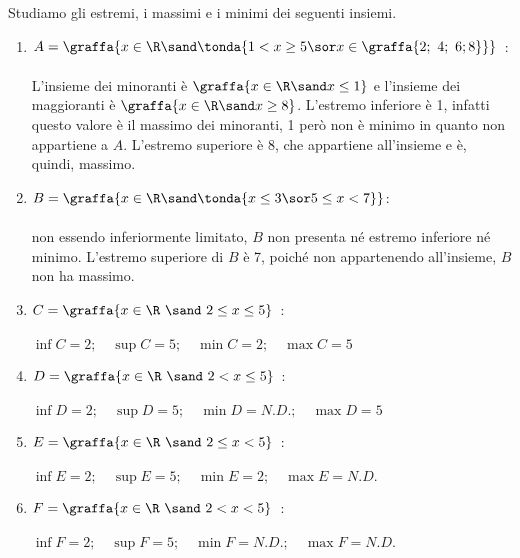 \begin{esempio}Studiamo gli estremi, i massimi e i minimi dei seguenti 
insiemi. %
\begin{enumerate}
\item 
\(A = \graffa{x\in\R \sand \tonda{1 < x \geq 5 \sor 
                                  x \in \graffa{2;~4;~6; 8}}}\)~:\\
\\
L'insieme dei minoranti è \(\graffa{x\in\R \sand x \leq 1}\) e
l'insieme dei maggioranti è \(\graffa{x\in\R \sand x \geq 8}\).
L'estremo inferiore è 1, infatti questo valore è il massimo 
dei minoranti, 1 però non è minimo in quanto non appartiene a \(A\). 
L'estremo superiore è 8, che appartiene all'insieme e è, quindi, massimo. 

\item \(B =\graffa{x \in \R \sand \tonda{x \leq 3 \sor 5 \leq x < 7}}\): \\
\\
non essendo inferiormente limitato, \(B\) non presenta né estremo inferiore 
né minimo. 
L'estremo superiore di \(B\) è 7, poiché non appartenendo all'insieme, 
\(B\) non ha massimo.

\item \(C = \graffa{x\in\R~\sand~ 2 \leq x \leq 5}\)~: \\
\\
\(\inf{C} = 2; \quad \sup{C} = 5; \quad \min{C} = 2; \quad \max{C} = 5\) 

\item \(D = \graffa{x\in\R~\sand~ 2 < x \leq 5}\)~: \\
\\
\(\inf{D} = 2; \quad \sup{D} = 5; \quad \min{D} = N.D.; \quad \max{D} = 5\)

\item \(E = \graffa{x\in\R~\sand~ 2 \leq x < 5}\)~: \\
\\
\(\inf{E} = 2; \quad \sup{E} = 5; \quad \min{E} = 2; \quad \max{E} = N.D.\)

\item \(F = \graffa{x\in\R~\sand~ 2 < x < 5}\)~: \\
\\
\(\inf{F} = 2; \quad \sup{F} = 5;\quad \min{F} = N.D.;\quad 
  \max{F} = N.D.\)
\end{enumerate}
\end{esempio}


